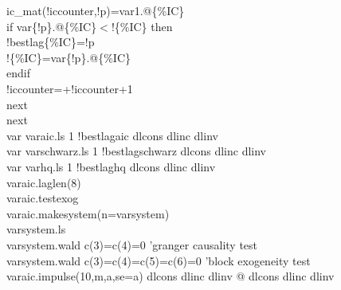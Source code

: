 \documentclass[a4paper,10pt]{article}
\begin{document}
\indent \indent		ic\_mat(!iccounter,!p)=var1.@\{\%IC\}\\
\indent \indent		if var\{!p\}.@\{\%IC\}$<$!\{\%IC\} then\\
\indent \indent	\indent	!bestlag\{\%IC\}=!p\\
 \indent \indent \indent			!\{\%IC\}=var\{!p\}.@\{\%IC\}\\
\indent \indent		endif\\
\indent	!iccounter=+!iccounter+1\\
\indent	next	\\
next\\
var varaic.ls 1 !bestlagaic dlcons dlinc dlinv\\
var varschwarz.ls 1 !bestlagschwarz dlcons dlinc dlinv\\
var varhq.ls 1 !bestlaghq dlcons dlinc dlinv\\
varaic.laglen(8)\\
varaic.testexog\\
varaic.makesystem(n=varsystem)\\
varsystem.ls\\
varsystem.wald c(3)=c(4)=0	'granger causality test\\
varsystem.wald c(3)=c(4)=c(5)=c(6)=0 'block exogeneity test\\
varaic.impulse(10,m,a,se=a) dlcons dlinc dlinv @ dlcons dlinc dlinv\\
\end{document}
